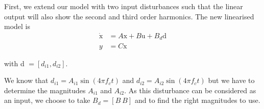 First, we extend our model with two input disturbances such that the linear output will also show the second and third order harmonics. The new linearised model is
\begin{align*}
   \dot{\text{x}} &= A\text{x} + B\text{u} +B_d\text{d}\\
   y &= C\text{x}
\end{align*}

with d $= [d_{i1}, d_{i2}]$.

We know that $d_{i1} = A_{i1}\sin(4\pi f_ct)$ and $d_{i2} = A_{i2}\sin(4\pi f_ct)$ but we have to determine the magnitudes $A_{i1}$ and $A_{i2}$. As this disturbance can be considered as an input, we choose to take $B_d = [B\ B]$ and to find the right magnitudes to use.